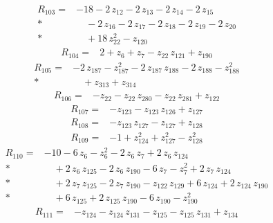 \documentclass[10pt]{article}
\begin{document}
\begin{align*}
R_{103}={}& - 18 - 2\,z_{12} - 2\,z_{13} - 2\,z_{14} - 2\,z_{15} \\*
&\quad - 2\,z_{16} - 2\,z_{17} - 2\,z_{18} - 2\,z_{19} - 2\,z_{20} \\*
&\quad + 18\,z_{22}^{2} - z_{120}
\end{align*}
\begin{align*}
R_{104}={}& 2 + z_{6} + z_{7} - z_{22}\,z_{121} + z_{190}
\end{align*}
\begin{align*}
R_{105}={}& - 2\,z_{187} - z_{187}^{2} - 2\,z_{187}\,z_{188} - 2\,z_{188} - z_{188}^{2} \\*
&\quad + z_{313} + z_{314}
\end{align*}
\begin{align*}
R_{106}={}& - z_{22} - z_{22}\,z_{280} - z_{22}\,z_{281} + z_{122}
\end{align*}
\begin{align*}
R_{107}={}& - z_{123} - z_{123}\,z_{126} + z_{127}
\end{align*}
\begin{align*}
R_{108}={}& - z_{123}\,z_{127} - z_{127} + z_{128}
\end{align*}
\begin{align*}
R_{109}={}& - 1 + z_{124}^{2} + z_{127}^{2} - z_{128}^{2}
\end{align*}
\begin{align*}
R_{110}={}& - 10 - 6\,z_{6} - z_{6}^{2} - 2\,z_{6}\,z_{7} + 2\,z_{6}\,z_{124} \\*
&\quad + 2\,z_{6}\,z_{125} - 2\,z_{6}\,z_{190} - 6\,z_{7} - z_{7}^{2} + 2\,z_{7}\,z_{124} \\*
&\quad + 2\,z_{7}\,z_{125} - 2\,z_{7}\,z_{190} - z_{122}\,z_{129} + 6\,z_{124} + 2\,z_{124}\,z_{190} \\*
&\quad + 6\,z_{125} + 2\,z_{125}\,z_{190} - 6\,z_{190} - z_{190}^{2}
\end{align*}
\begin{align*}
R_{111}={}& - z_{124} - z_{124}\,z_{131} - z_{125} - z_{125}\,z_{131} + z_{134}
\end{align*}
\end{document}
